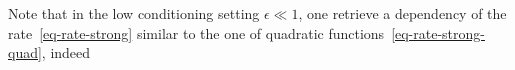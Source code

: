 Note that in the low conditioning setting $\epsilon \ll 1$, one retrieve a dependency of the rate~\eqref{eq-rate-strong} similar to the one of quadratic functions~\eqref{eq-rate-strong-quad}, indeed 









